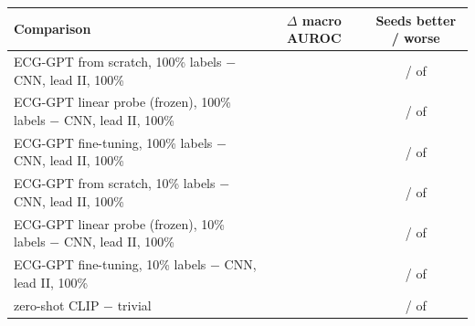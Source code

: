 \begin{tabular}{lcc}
\toprule
Comparison & $\Delta$ macro AUROC & Seeds better / worse \\
\midrule
ECG-GPT from scratch, 100\% labels $-$ CNN, lead II, 100\% & \comparisonTestDiffMeanScratchFOneZeroZeroVsOneleadCnn{} & \comparisonTestNBetterScratchFOneZeroZeroVsOneleadCnn{} / \comparisonTestNWorseScratchFOneZeroZeroVsOneleadCnn{} of \comparisonTestNComparedScratchFOneZeroZeroVsOneleadCnn{} \\
ECG-GPT linear probe (frozen), 100\% labels $-$ CNN, lead II, 100\% & \comparisonTestDiffMeanProbeFOneZeroZeroVsOneleadCnn{} & \comparisonTestNBetterProbeFOneZeroZeroVsOneleadCnn{} / \comparisonTestNWorseProbeFOneZeroZeroVsOneleadCnn{} of \comparisonTestNComparedProbeFOneZeroZeroVsOneleadCnn{} \\
ECG-GPT fine-tuning, 100\% labels $-$ CNN, lead II, 100\% & \comparisonTestDiffMeanFinetuneFOneZeroZeroVsOneleadCnn{} & \comparisonTestNBetterFinetuneFOneZeroZeroVsOneleadCnn{} / \comparisonTestNWorseFinetuneFOneZeroZeroVsOneleadCnn{} of \comparisonTestNComparedFinetuneFOneZeroZeroVsOneleadCnn{} \\
ECG-GPT from scratch, 10\% labels $-$ CNN, lead II, 100\% & \comparisonTestDiffMeanScratchFOneZeroVsOneleadCnn{} & \comparisonTestNBetterScratchFOneZeroVsOneleadCnn{} / \comparisonTestNWorseScratchFOneZeroVsOneleadCnn{} of \comparisonTestNComparedScratchFOneZeroVsOneleadCnn{} \\
ECG-GPT linear probe (frozen), 10\% labels $-$ CNN, lead II, 100\% & \comparisonTestDiffMeanProbeFOneZeroVsOneleadCnn{} & \comparisonTestNBetterProbeFOneZeroVsOneleadCnn{} / \comparisonTestNWorseProbeFOneZeroVsOneleadCnn{} of \comparisonTestNComparedProbeFOneZeroVsOneleadCnn{} \\
ECG-GPT fine-tuning, 10\% labels $-$ CNN, lead II, 100\% & \comparisonTestDiffMeanFinetuneFOneZeroVsOneleadCnn{} & \comparisonTestNBetterFinetuneFOneZeroVsOneleadCnn{} / \comparisonTestNWorseFinetuneFOneZeroVsOneleadCnn{} of \comparisonTestNComparedFinetuneFOneZeroVsOneleadCnn{} \\
zero-shot CLIP $-$ trivial & \comparisonTestDiffMeanZeroshotVsTrivial{} & \comparisonTestNBetterZeroshotVsTrivial{} / \comparisonTestNWorseZeroshotVsTrivial{} of \comparisonTestNComparedZeroshotVsTrivial{} \\
\bottomrule
\end{tabular}
